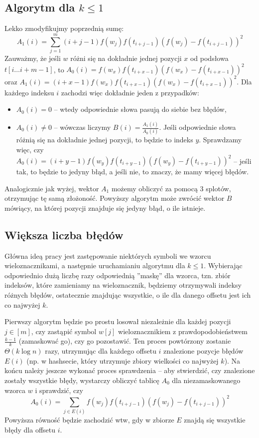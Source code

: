\documentclass[a4paper,12pt]{article}
\theoremstyle{definition}
\begin{document}
\subsection{Algorytm dla $k\le1$}
Lekko zmodyfikujmy poprzednią sumę:
\[A_1(i) = \sum_{j=1}^m (i+j-1)f(w_j) f(t_{i+j-1})(f(w_j) - f(t_{i+j-1}))^2\]
Zauważmy, że jeśli $w$ różni się na dokładnie jednej pozycji $x$ od podsłowa $t[i\dots i+m-1]$, to $A_0(i) = f(w_x) f(t_{i+x-1})(f(w_x) - f(t_{i+x-1}))^2$ oraz $A_1(i) = (i+x-1)f(w_x) f(t_{i+x-1})(f(w_x) - f(t_{i+x-1}))^2$. Dla każdego indeksu $i$ zachodzi więc dokładnie jeden z przypadków:
\begin{itemize}
    \item $A_0(i) = 0$ -- wtedy odpowiednie słowa pasują do siebie bez błędów,
    \item $A_0(i) \ne 0$ -- wówczas liczymy $B(i) = \frac{A_1(i)}{A_0(i)}$. Jeśli odpowiednie słowa różnią się na dokładnie jednej pozycji, to będzie to indeks $y$. Sprawdzamy więc, czy $A_0(i) = (i+y-1)f(w_y) f(t_{i+y-1})(f(w_y) - f(t_{i+y-1}))^2$ -- jeśli tak, to będzie to jedyny błąd, a jeśli nie, to znaczy, że mamy więcej błędów.
\end{itemize}
Analogicznie jak wyżej, wektor $A_1$ możemy obliczyć za pomocą 3 splotów, otrzymując tę samą złożoność. Powyższy algorytm może zwrócić wektor $B$ mówiący, na której pozycji znajduje się jedyny błąd, o ile istnieje.

\subsection{Większa liczba błędów}
Główna ideą pracy jest zastępowanie niektórych symboli we wzorcu wieloznacznikami, a następnie uruchamianiu algorytmu dla $k \le 1$. Wybierając odpowiednio dużą liczbę razy odpowiednią ''maskę'' dla wzorca, tzn. zbiór indeksów, które zamieniamy na wieloznacznik, będziemy otrzymywali indeksy różnych błędów, ostatecznie znajdując wszystkie, o ile dla danego offsetu jest ich co najwyżej $k$.

Pierwszy algorytm będzie po prostu losował niezależnie dla każdej pozycji $j\in[m]$, czy zastąpić symbol $w[j]$ wieloznacznikiem z prawdopodobieństwem $\frac{k-1}{k}$ (zamaskować go), czy go pozostawić. Ten proces powtórzony zostanie $\Theta(k \log n)$ razy, utrzymując dla każdego offsetu $i$ znalezione pozycje błędów $E(i)$ (np. w hashsecie, który utrzymuje zbiory wielkości co najwyżej $k$). Na końcu należy jeszcze wykonać proces sprawdzenia --  aby stwierdzić, czy znalezione zostały wszystkie błędy, wystarczy obliczyć tablicę $A_0$ dla niezamaskowanego wzorca $w$ i sprawdzić, czy 
\[A_0(i) = \sum_{j \in E(i)} f(w_j) f(t_{i+j-1})(f(w_j) - f(t_{i+j-1}))^2\]
Powyższa równość będzie zachodzić wtw, gdy w zbiorze $E$ znajdą się wszystkie błędy dla offsetu $i$.
\end{document}
